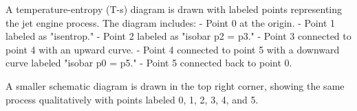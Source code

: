 A temperature-entropy (T-s) diagram is drawn with labeled points representing the jet engine process. The diagram includes:  
- Point 0 at the origin.  
- Point 1 labeled as "isentrop."  
- Point 2 labeled as "isobar p2 = p3."  
- Point 3 connected to point 4 with an upward curve.  
- Point 4 connected to point 5 with a downward curve labeled "isobar p0 = p5."  
- Point 5 connected back to point 0.  

A smaller schematic diagram is drawn in the top right corner, showing the same process qualitatively with points labeled 0, 1, 2, 3, 4, and 5.